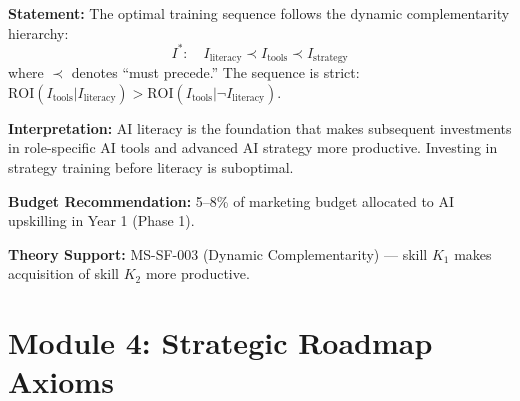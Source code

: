 \begin{tcolorbox}[colback=gray!5!white, colframe=gray!75!black,
    title=Axiom AIM-15: Optimal Training Sequence]
\label{ax:aim-15}

\textbf{Statement:}
The optimal training sequence follows the dynamic complementarity hierarchy:
\begin{equation}
I^*: \quad I_{\text{literacy}} \prec I_{\text{tools}} \prec I_{\text{strategy}}
\label{eq:aim-training-sequence}
\end{equation}
where $\prec$ denotes ``must precede.'' The sequence is strict:
$\text{ROI}(I_{\text{tools}} | I_{\text{literacy}}) > \text{ROI}(I_{\text{tools}} | \neg I_{\text{literacy}})$.

\textbf{Interpretation:} AI literacy is the foundation that makes
subsequent investments in role-specific AI tools and advanced AI strategy
more productive. Investing in strategy training before literacy is suboptimal.

\textbf{Budget Recommendation:} 5--8\% of marketing budget allocated to
AI upskilling in Year 1 (Phase 1).

\textbf{Theory Support:} MS-SF-003 (Dynamic Complementarity) ---
skill $K_1$ makes acquisition of skill $K_2$ more productive.
\end{tcolorbox}


\section{Module 4: Strategic Roadmap Axioms}
\label{sec:aim-m4}

